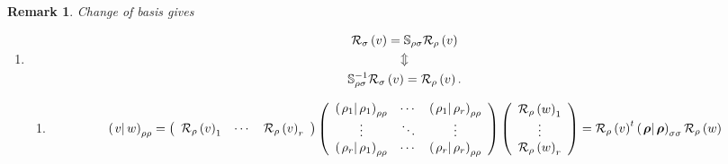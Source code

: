 \documentclass[aps,preprint]{revtex4}
\newtheorem{remark}[theorem]{Remark}
\begin{document}
\begin{remark}
Change of basis gives

\begin{enumerate}
\item 
\begin{gather}
\mathcal{R}_{\sigma }\left( v\right) =\mathbb{S}_{\rho \sigma }\mathcal{R}%
_{\rho }\left( v\right) \\
\Updownarrow \\
\mathbb{S}_{\rho \sigma }^{-1}\mathcal{R}_{\sigma }\left( v\right) =\mathcal{%
R}_{\rho }\left( v\right) .
\end{gather}

\begin{enumerate}
\item 
\begin{equation}
\left( \left. v\right\vert w\right) _{\rho \rho }=\left( 
\begin{array}{ccc}
\mathcal{R}_{\rho }\left( v\right) _{1} & \cdots & \mathcal{R}_{\rho }\left(
v\right) _{r}%
\end{array}%
\right) \left( 
\begin{array}{ccc}
\left( \left. \rho _{1}\right\vert \rho _{1}\right) _{\rho \rho } & \cdots & 
\left( \left. \rho _{1}\right\vert \rho _{r}\right) _{\rho \rho } \\ 
\vdots & \ddots & \vdots \\ 
\left( \left. \rho _{r}\right\vert \rho _{1}\right) _{\rho \rho } & \cdots & 
\left( \left. \rho _{r}\right\vert \rho _{r}\right) _{\rho \rho }%
\end{array}%
\right) \left( 
\begin{array}{c}
\mathcal{R}_{\rho }\left( w\right) _{1} \\ 
\vdots \\ 
\mathcal{R}_{\rho }\left( w\right) _{r}%
\end{array}%
\right) =\mathcal{R}_{\rho }\left( v\right) ^{t}\left( \left. \boldsymbol{%
\rho }\right\vert \boldsymbol{\rho }\right) _{\sigma \sigma }\mathcal{R}%
_{\rho }\left( w\right)
\end{equation}


\end{enumerate}
\end{enumerate}
\end{remark}
\end{document}
